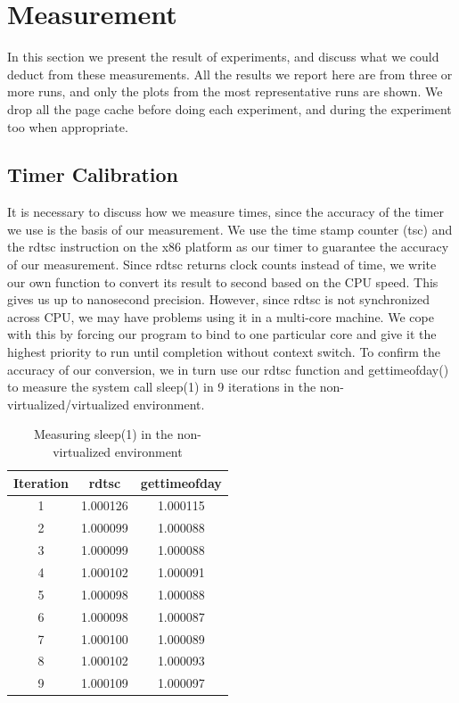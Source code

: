 \section{Measurement}
\label{section:measurement}

In this section we present the result of experiments, and discuss what we could deduct from these measurements. All the results we report here are from three or more runs, and only the plots from the most representative runs are shown. We drop all the page cache before doing each experiment, and during the experiment too when appropriate.

\subsection{Timer Calibration}
It is necessary to discuss how we measure times, since the accuracy of the timer we use is the basis of our measurement. We use the time stamp counter (tsc) and the rdtsc instruction on the x86 platform as our timer to guarantee the accuracy of our measurement. Since rdtsc returns clock counts instead of time, we write our own function to convert its result to second based on the CPU speed. This gives us up to nanosecond precision. However, since rdtsc is not synchronized across CPU, we may have problems using it in a multi-core machine. We cope with this by forcing our program to bind to one particular core and give it the highest priority to run until completion without context switch. To confirm the accuracy of our conversion, we in turn use our rdtsc function and gettimeofday() to measure the system call sleep(1) in 9 iterations in the non-virtualized/virtualized environment. 

\begin{table}[!thb]
\centering
\begin{tabular}{|c|c|c|} \hline
Iteration & rdtsc & gettimeofday \\ \hline
1 & 1.000126 & 1.000115 \\ \hline
2 & 1.000099 & 1.000088 \\ \hline
3 & 1.000099 & 1.000088 \\ \hline
4 & 1.000102 & 1.000091 \\ \hline
5 & 1.000098 & 1.000088 \\ \hline
6 & 1.000098 & 1.000087 \\ \hline
7 & 1.000100 & 1.000089 \\ \hline
8 & 1.000102 & 1.000093 \\ \hline
9 & 1.000109 & 1.000097 \\ \hline
\end{tabular}\label{tab:cali_non_virtual}
\caption{Measuring sleep(1) in the non-virtualized environment}
\end{table}


